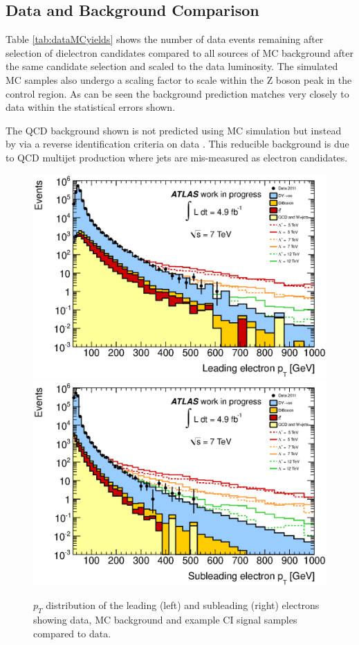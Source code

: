 \subsection{Data and Background Comparison}

	Table \ref{tab:dataMCyields} shows the number of data events remaining after selection of dielectron candidates compared to all sources of MC background after the same candidate selection and scaled to the data luminosity.  The simulated MC samples also undergo a scaling factor to scale within the Z boson peak in the control region. As can be seen the background prediction matches very closely to data within the statistical errors shown.

	The QCD background shown is not predicted using MC simulation but instead by via a reverse identification criteria on data \cite{QCD}. This reducible background is due to QCD multijet production where jets are mis-measured as electron candidates.



	\begin{figure}[h!]
	\centering
	\includegraphics[width=0.49\linewidth]{images/lead_pT.eps}
	\includegraphics[width=0.49\linewidth]{images/sub_pT.eps}
	\caption{$p_{T}$ distribution of the leading (left) and subleading (right) electrons showing data, MC background and example CI signal samples compared to data.}
	\label{fig:CIpT}
	\end{figure}


